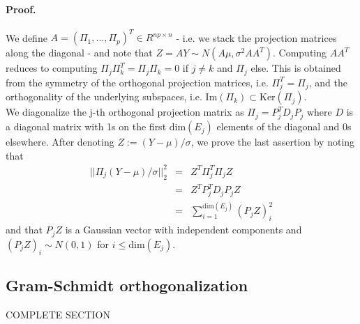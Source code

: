 \documentclass[]{article}
\begin{document}
\paragraph{Proof.} We define $A=(\Pi_1,...,\Pi_p)^T\in R^{np \times n}$ - i.e. we stack the projection matrices along the diagonal - and note that $Z=AY\sim N(A\mu, \sigma^2 AA^T)$. Computing $AA^T$ reduces to computing $\Pi_j\Pi_k^T=\Pi_j\Pi_k=0$ if $j\neq k$ and $\Pi_j$ else. This is obtained from the symmetry of the orthogonal projection matrices, i.e. $\Pi_j^T=\Pi_j$, and the orthogonality of the underlying subspaces, i.e. $\mathrm{Im}(\Pi_k)\subset\mathrm{Ker}(\Pi_j)$.\\
We diagonalize the j-th orthogonal projection matrix as $\Pi_j=P_j^TD_jP_j$ where $D$ is a diagonal matrix with 1s on the first $\mathrm{dim}(E_j)$ elements of the diagonal and 0s elsewhere. After denoting $Z:=(Y-\mu)/\sigma$, we prove the last assertion by noting that
\begin{eqnarray}
||\Pi_j (Y-\mu)/\sigma||_2^2 &=& Z^T\Pi_j^T\Pi_j Z \\
&=& Z^T P_j^T D_j P_j Z \\
&=& \sum_{i=1}^{\mathrm{dim}(E_j)} (P_j Z)_i^2
\end{eqnarray}
and that $P_j Z$ is a Gaussian vector with independent components and $(P_j Z)_i \sim N(0,1)$ for $i\leq \mathrm{dim}(E_j)$.

\subsection{Gram-Schmidt orthogonalization}

COMPLETE SECTION
\end{document}
